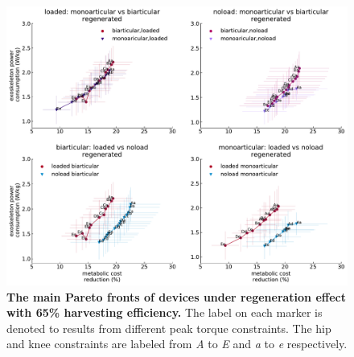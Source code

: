 \documentclass[10pt,letterpaper]{article}
\begin{document}
\begin{figure}[t!]   
	\centering
	\includegraphics[width=\linewidth]{Pareto_Mass_Regenration_Figures/PaperFigure_Main_Pareto_Regenerated.pdf}
	\vspace{1mm}
	\caption{{\small\textbf{The main Pareto fronts of devices under regeneration effect with 65\% harvesting efficiency.} The label on each marker is denoted to results from different peak torque constraints. The hip and knee constraints are labeled from {\it A} to {\it E} and {\it a} to {\it e} respectively.}}
	\label{Fig_Regenerated_Main_Paretofronts}
\end{figure}
\end{document}
